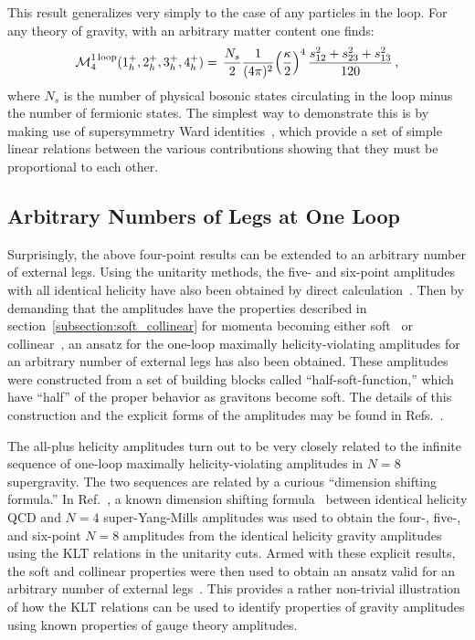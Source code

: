 This result generalizes very simply to the case of any particles in
the loop.  For any theory of gravity, with an arbitrary matter content
one finds:
%
\begin{equation}
{\cal M}_4^{\rm 1\, loop} (1^+_h, 2^+_h, 3^+_h, 4^+_h)  =  \, {N_s\over 2}
 {1 \over (4 \pi)^2} 
\Bigl({\kappa\over 2} \Bigr)^4\, 
{s_{12}^2 + s_{23}^2 + s_{13}^2 \over 120} \,, 
\label{FourGravPlusGen}
\end{equation}
%
where $N_s$ is the number of physical bosonic states circulating in
the loop minus the number of fermionic states.  The simplest way to
demonstrate this is by making use of supersymmetry Ward
identities~\cite{Grisaru77SWIB,Parke85SWI,Review}, which provide a set
of simple linear relations between the various contributions showing that
they must be proportional to each other.


\subsection{Arbitrary Numbers of Legs at One Loop}

Surprisingly, the above four-point results can be extended to an
arbitrary number of external legs.  Using the unitarity methods, the
five- and six-point amplitudes with all identical helicity have also
been obtained by direct calculation~\cite{AllPlusGrav,MHVGrav}.  Then
by demanding that the amplitudes have the properties described in
section~\ref{subsection:soft_collinear} for momenta becoming either
soft~\cite{WeinbergSoftG,BGK} or collinear~\cite{AllPlusGrav}, an
ansatz for the one-loop maximally helicity-violating amplitudes for an
arbitrary number of external legs has also been obtained.  These amplitudes
were constructed from a set of building blocks called
``half-soft-function,'' which have ``half'' of the proper behavior as
gravitons become soft.  The details of this construction and the
explicit forms of the amplitudes may be found in
Refs.~\cite{AllPlusGrav,MHVGrav}.

The all-plus helicity amplitudes turn out to be very closely related
to the infinite sequence of one-loop maximally helicity-violating
amplitudes in $N=8$ supergravity.  The two sequences are related by a
curious ``dimension shifting formula.''  In Ref.~\cite{MHVGrav}, a known
dimension shifting formula~\cite{Bern97DimShift} between identical helicity
QCD and $N=4$ super-Yang-Mills amplitudes was used to obtain the
four-, five-, and six-point $N=8$ amplitudes from the identical 
helicity gravity amplitudes using the KLT relations in the 
unitarity cuts.  Armed with these explicit results, the soft and
collinear properties were then used to obtain an ansatz valid for an
arbitrary number of external legs~\cite{MHVGrav}.  This provides a
rather non-trivial illustration of how the KLT relations can be used
to identify properties of gravity amplitudes using known properties of
gauge theory amplitudes.

